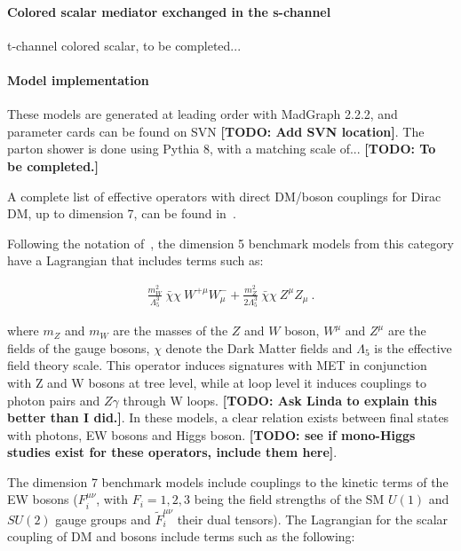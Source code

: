 \paragraph{Colored scalar mediator exchanged in the s-channel}

t-channel colored scalar, to be completed...

\paragraph{Model implementation}

These models are generated at leading order with MadGraph 2.2.2, and parameter
cards can be found on SVN \textbf{[TODO: Add SVN location]}.
The parton shower is done using Pythia 8, with a matching scale of... 
\textbf{[TODO: To be completed.]}


A complete list of effective operators with direct DM/boson couplings for
Dirac DM, up to dimension 7, can be found in~\cite{Cotta:2012nj}. 

Following the notation of~\cite{Carpenter:2012rg}, the dimension 5 benchmark models 
from this category have a Lagrangian that includes terms such as:

\begin{eqnarray}
\frac{m_W^2}{\Lambda_5^3} ~\bar{\chi} \chi ~W^{+ \mu} W^{-}_\mu
+ \frac{m_Z^2}{2 \Lambda_5^3} ~ \bar{\chi} \chi ~ Z^\mu Z_\mu ~.
\end{eqnarray}
 
where $m_Z$ and $m_W$ are the masses of the $Z$ and $W$ boson, $W^{\mu}$ and $Z^{\mu}$
are the fields of the gauge bosons, $\chi$ denote the Dark Matter fields 
and $\Lambda_5$ is the effective field theory scale. This operator 
induces signatures with MET in conjunction with Z and W bosons at tree level,
while at loop level it induces couplings to photon pairs and $Z \gamma$ through W loops. 
\textbf{[TODO: Ask Linda to explain this better than I did.]}.  
In these models, a clear relation exists between final states with photons, EW bosons
and Higgs boson. \textbf{[TODO: see if mono-Higgs studies exist for these operators, include them here]}.

The dimension 7 benchmark models include couplings to the kinetic
terms of the EW bosons ($F^{\mu\nu}_i$, with $F_i=1,2,3$ being the field strengths
of the SM $U(1)$ and $SU(2)$ gauge groups and $\tilde F^{\mu\nu}_i$ their dual tensors). 
The Lagrangian for the scalar coupling of DM and bosons include terms such as the following:

